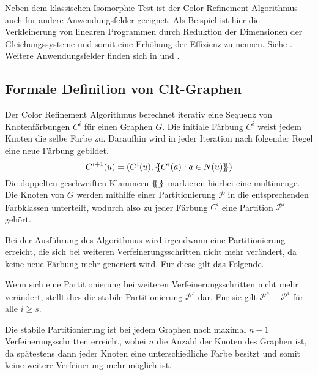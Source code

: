 Neben dem klassischen Isomorphie-Test ist der Color Refinement Algorithmus auch für andere Anwendungsfelder geeignet.
Als Beispiel ist hier die Verkleinerung von linearen Programmen durch Reduktion der Dimensionen der Gleichungssysteme und somit eine Erhöhung der Effizienz zu nennen.
Siehe \cite{Grohe2014}.
Weitere Anwendungsfelder finden sich in \cite{shervashidze2011weisfeiler} und \cite{kersting2014power}.

\subsection{Formale Definition von CR-Graphen}
Der Color Refinement Algorithmus berechnet iterativ eine Sequenz von Knotenfärbungen $C^i$ für einen Graphen $G$.
Die initiale Färbung $C^i$ weist jedem Knoten die selbe Farbe zu.
Daraufhin wird in jeder Iteration nach folgender Regel eine neue Färbung gebildet.
\begin{equation}
C^{i+1}(u)=(C^i(u),\{\mskip-5mu\{ C^i(a):a\in N(u)\}\mskip-5mu\} )
\label{eq:1}
\end{equation}
Die doppelten geschweiften Klammern $\{\mskip-5mu\{ \}\mskip-5mu\} $ markieren hierbei eine \gls{multimenge}.
Die Knoten von $G$ werden mithilfe einer Partitionierung $\mathcal{P}$ in die entsprechenden Farbklassen unterteilt, wodurch also zu jeder Färbung $C^i$ eine Partition $\mathcal{P}^i$ gehört.

Bei der Ausführung des Algorithmus wird irgendwann eine Partitionierung erreicht, die sich bei weiteren Verfeinerungsschritten nicht mehr verändert, da keine neue Färbung mehr generiert wird.
Für diese gilt das Folgende.
\begin{Definition}
	Wenn sich eine Partitionierung bei weiteren Verfeinerungsschritten nicht mehr verändert, stellt dies die stabile Partitionierung $\mathcal{P}^s$ dar.
	Für sie gilt $\mathcal{P}^s=\mathcal{P}^i$ für alle $i\geq s$.
\end{Definition}
Die stabile Partitionierung ist bei jedem Graphen nach maximal $n-1$ Verfeinerungsschritten erreicht, wobei $n$ die Anzahl der Knoten des Graphen ist, da spätestens dann jeder Knoten eine unterschiedliche Farbe besitzt und somit keine weitere Verfeinerung mehr möglich ist.

